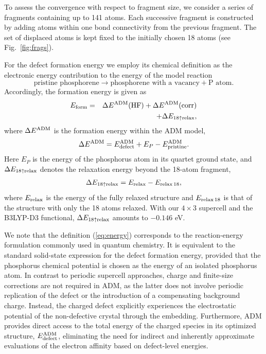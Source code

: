 \documentclass[aip,jcp,reprint]{revtex4-2}
\begin{document}
To assess the convergence with respect to fragment size, we consider a series of fragments containing up to 141 atoms. Each successive fragment is constructed by adding atoms within one bond connectivity from the previous fragment. The set of displaced atoms is kept fixed to the initially chosen 18 atoms (see Fig.~\ref{fig:frags}).


For the defect formation energy we employ its chemical definition as the electronic energy contribution to the energy of the model reaction
\[
\text{pristine phosphorene} \rightarrow \text{phosphorene with a vacancy} + \text{P atom}.
\]
Accordingly, the formation energy is given as
\begin{eqnarray}
  E_{\rm form}&=&\Delta E^{\rm ADM}({\rm HF}) + \Delta E^{\rm ADM}({\rm corr})\nonumber\\
  &&+\Delta E_{\rm 18\uparrow relax},\label{eq:energy}
\end{eqnarray}
where $\Delta E^{\rm ADM}$ is the formation energy within the ADM model,
\begin{eqnarray}
  \Delta E^{\rm ADM}=E^{\rm ADM}_{\rm defect} + E_P - E^{\rm ADM}_{\rm pristine}.
\end{eqnarray}
Here $E_P$ is the energy of the phosphorus atom in its quartet ground state, and $\Delta E_{\rm 18\uparrow relax}$ denotes the relaxation energy beyond the 18-atom fragment,
\begin{eqnarray}
  \Delta E_{\rm 18\uparrow relax}=E_{\rm relax} - E_{\rm relax\,18},
\end{eqnarray}
where $E_{\rm relax}$ is the energy of the fully relaxed structure and $E_{\rm relax\,18}$ is that of the structure with only the 18 atoms relaxed. With our $4\times3$ supercell and the B3LYP-D3 functional, $\Delta E_{\rm 18\uparrow relax}$ amounts to $-0.146$ eV.

We note that the definition (\ref{eq:energy}) corresponds to the reaction-energy formulation commonly used in quantum chemistry. It is equivalent to the standard solid-state expression for the defect formation energy\cite{Freysoldt2014Review}, provided that the phosphorus chemical potential is chosen as the energy of an isolated phosphorus atom. In contrast to periodic supercell approaches, charge and finite-size corrections are not required in ADM, as the latter does not involve periodic replication of the defect or the introduction of a compensating background charge. Instead, the charged defect explicitly experiences the electrostatic potential of the non-defective crystal through the embedding. Furthermore, ADM provides direct access to the total energy of the charged species in its optimized structure, $E^{\rm ADM}_{\rm defect}$, eliminating the need for indirect and inherently approximate evaluations of the electron affinity based on defect-level energies.
\end{document}
